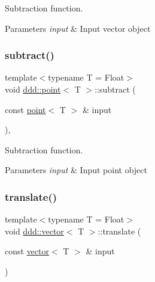 Subtraction function. 


\begin{DoxyParams}{Parameters}
{\em input} & Input vector object \\
\hline
\end{DoxyParams}
\mbox{\label{classddd_1_1point_abf2e2ea5474534eb17d1cb6bd96b7913}} 
\subsubsection{\texorpdfstring{subtract()}{subtract()}\hspace{0.1cm}{\footnotesize\ttfamily [2/2]}}
{\footnotesize\ttfamily template$<$typename T = Float$>$ \\
void \hyperlink{classddd_1_1point}{ddd\+::point}$<$ T $>$\+::subtract (\begin{DoxyParamCaption}\item[{const \hyperlink{classddd_1_1point}{point}$<$ T $>$ \&}]{input }\end{DoxyParamCaption})\hspace{0.3cm}{\ttfamily [inline]}, {\ttfamily [inherited]}}



Subtraction function. 


\begin{DoxyParams}{Parameters}
{\em input} & Input point object \\
\hline
\end{DoxyParams}
\mbox{\label{classddd_1_1vector_a5d9764ea0d9e7342d967199070b1b744}} 
\subsubsection{\texorpdfstring{translate()}{translate()}}
{\footnotesize\ttfamily template$<$typename T = Float$>$ \\
void \hyperlink{classddd_1_1vector}{ddd\+::vector}$<$ T $>$\+::translate (\begin{DoxyParamCaption}\item[{const \hyperlink{classddd_1_1vector}{vector}$<$ T $>$ \&}]{input }\end{DoxyParamCaption})\hspace{0.3cm}{\ttfamily [inline]}}



